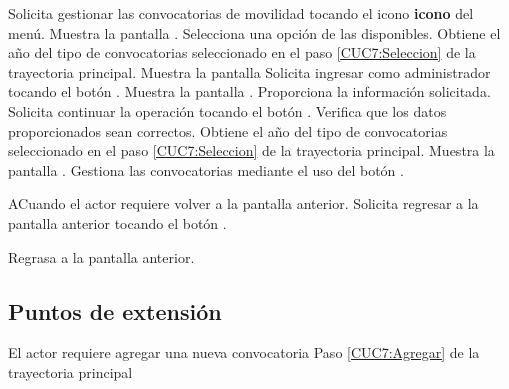 	\begin{UCtrayectoria}
		\UCpaso[\UCactor] Solicita gestionar las convocatorias de movilidad tocando el icono \textbf{icono} del menú.
		\UCpaso [\UCsist] Muestra la pantalla .
		\UCpaso[\UCactor] \label{CUC7:Seleccion} Selecciona una opción de las disponibles.
		\UCpaso [\UCsist] Obtiene el año del tipo de convocatorias seleccionado en el paso \ref{CUC7:Seleccion} de la trayectoria principal.
		\UCpaso [\UCsist] Muestra la pantalla 
		\UCpaso [\UCactor] Solicita ingresar como administrador tocando el botón . 
		\UCpaso [\UCsist] Muestra la pantalla .
		\UCpaso [\UCactor] \label{CUC7:Datos} Proporciona la información solicitada.
		\UCpaso [\UCactor] Solicita continuar la operación tocando el botón . 
		\UCpaso [\UCsist] Verifica que los datos proporcionados sean correctos. 
		\UCpaso [\UCsist] Obtiene el año del tipo de convocatorias seleccionado en el paso \ref{CUC7:Seleccion} de la trayectoria principal.
		\UCpaso [\UCsist] Muestra la pantalla .
		\UCpaso [\UCactor]  \label{CUC7:Agregar} Gestiona las convocatorias mediante el uso del botón .
		
	\end{UCtrayectoria}
	
	\begin{UCtrayectoriaA}{A}{Cuando el actor requiere volver a la pantalla anterior.}
		\UCpaso[\UCactor] Solicita regresar a la pantalla anterior tocando el botón .
		
		\UCpaso [\UCsist] Regrasa a la pantalla anterior.
	\end{UCtrayectoriaA}
	
	\subsection{Puntos de extensión}
	
	\UCExtensionPoint
	{El actor requiere agregar una nueva convocatoria}
	{ Paso \ref{CUC7:Agregar} de la trayectoria principal}
	{}
	